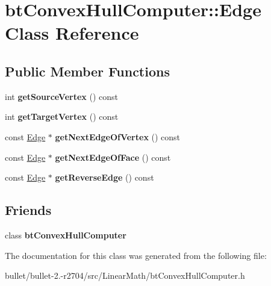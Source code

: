 \hypertarget{classbt_convex_hull_computer_1_1_edge}{\section{bt\+Convex\+Hull\+Computer\+:\+:Edge Class Reference}
\label{classbt_convex_hull_computer_1_1_edge}
}
\subsection*{Public Member Functions}
\begin{DoxyCompactItemize}
\item 
\hypertarget{classbt_convex_hull_computer_1_1_edge_ace1542407872efa97057942777d4591c}{int {\bfseries get\+Source\+Vertex} () const }\label{classbt_convex_hull_computer_1_1_edge_ace1542407872efa97057942777d4591c}

\item 
\hypertarget{classbt_convex_hull_computer_1_1_edge_acea14f67959e1cff3b87d7987a25f954}{int {\bfseries get\+Target\+Vertex} () const }\label{classbt_convex_hull_computer_1_1_edge_acea14f67959e1cff3b87d7987a25f954}

\item 
\hypertarget{classbt_convex_hull_computer_1_1_edge_a2cc094cbfcf93ab9bb1a893e99a753d0}{const \hyperlink{classbt_convex_hull_computer_1_1_edge}{Edge} $\ast$ {\bfseries get\+Next\+Edge\+Of\+Vertex} () const }\label{classbt_convex_hull_computer_1_1_edge_a2cc094cbfcf93ab9bb1a893e99a753d0}

\item 
\hypertarget{classbt_convex_hull_computer_1_1_edge_ab68bb893d50620f2f0a967277e3d9027}{const \hyperlink{classbt_convex_hull_computer_1_1_edge}{Edge} $\ast$ {\bfseries get\+Next\+Edge\+Of\+Face} () const }\label{classbt_convex_hull_computer_1_1_edge_ab68bb893d50620f2f0a967277e3d9027}

\item 
\hypertarget{classbt_convex_hull_computer_1_1_edge_a820c7dd3db1b3b40d8bba5b37317226a}{const \hyperlink{classbt_convex_hull_computer_1_1_edge}{Edge} $\ast$ {\bfseries get\+Reverse\+Edge} () const }\label{classbt_convex_hull_computer_1_1_edge_a820c7dd3db1b3b40d8bba5b37317226a}

\end{DoxyCompactItemize}
\subsection*{Friends}
\begin{DoxyCompactItemize}
\item 
\hypertarget{classbt_convex_hull_computer_1_1_edge_acce0ec14217db877328c5854838aca49}{class {\bfseries bt\+Convex\+Hull\+Computer}}\label{classbt_convex_hull_computer_1_1_edge_acce0ec14217db877328c5854838aca49}

\end{DoxyCompactItemize}


The documentation for this class was generated from the following file\+:\begin{DoxyCompactItemize}
\item 
bullet/bullet-\/2.-\/r2704/src/\+Linear\+Math/bt\+Convex\+Hull\+Computer.\+h\end{DoxyCompactItemize}
